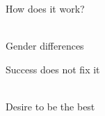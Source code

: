 \documentclass[aspectratio=169]{beamer}
\begin{document}
\begin{frame}
  \begin{center}
    \Huge How does it work?
    \\ \small \cite{hh15}
    \\ \small \cite{langford93}
  \end{center}
\end{frame}

\begin{frame}
  \begin{center}
    \Huge Gender differences
    \\ \small \cite{clanceimes78}
  \end{center}
\end{frame}

\begin{frame}
  \begin{center}
    \Huge Success does not fix it
    \\ \small \cite{clanceimes78}
    \\ \small \cite{sakulku11}
  \end{center}
\end{frame}

\begin{frame}
  \begin{center}
    \Huge Desire to be the best
    \\ \small \cite{sakulku11}
  \end{center}
\end{frame}
\end{document}

